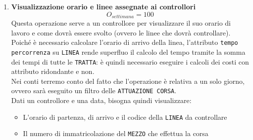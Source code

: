 \documentclass[12pt,a4paper]{report}
\begin{document}
\begin{enumerate}[label=\textbf{\arabic*)}]

    \item \textbf{Visualizzazione orario e linee assegnate ai controllori} \label{op5} \\
    \[ {O_{settimana} = 100} \]
    Questa operazione serve a un controllore per visualizzare il suo orario di lavoro e come dovrà essere svolto (ovvero le linee che dovrà controllare). Poiché è necessario calcolare l'orario di arrivo della linea, l'attributo \texttt{tempo percorrenza} su \texttt{LINEA} rende superfluo il calcolo del tempo tramite la somma dei tempi di tutte le \texttt{TRATTA}: è quindi necessario eseguire i calcoli dei costi con attributo ridondante e non. \\
    Nei conti terremo conto del fatto che l'operazione è relativa a un solo giorno, ovvero sarà eseguito un filtro delle \texttt{ATTUAZIONE CORSA}. \\
    Dati un controllore e una data, bisogna quindi visualizzare:
    \begin{itemize}
    \renewcommand\labelitemi{--}
    \item L'orario di partenza, di arrivo e il codice della \texttt{LINEA} da controllare
    \item Il numero di immatricolazione del \texttt{MEZZO} che effettua la corsa
    \end{itemize}


\end{enumerate}
\end{document}
